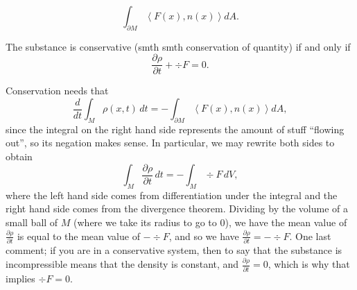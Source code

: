 \[ \int_{\partial M} \left<F(x), n(x)\right> dA. \]
\begin{simpleprop}
    The substance is conservative (smth smth conservation of quantity) if and only if
    \[ \frac{\partial \rho}{\partial t} + \div F = 0. \]
\end{simpleprop}
\noindent Conservation needs that
\[ \frac{d}{dt} \int_M \rho(x, t) \, dt = - \int_{\partial M} \left<F(x), n(x)\right> dA, \]
since the integral on the right hand side represents the amount of stuff ``flowing out'', so its negation makes sense. In particular, we may rewrite both sides to obtain
\[ \int_M \frac{\partial \rho}{\partial t} \, dt = - \int_M \div F \, dV, \]
where the left hand side comes from differentiation under the integral and the right hand side comes from the divergence theorem. Dividing by the volume of a small ball of $M$ (where we take its radius to go to $0$), we have the mean value of $\frac{\partial \rho}{\partial t}$ is equal to the mean value of $-\div F$, and so we have $\frac{\partial \rho}{\partial t} = - \div F$. One last comment; if you are in a conservative system, then to say that the substance is incompressible means that the density is constant, and $\frac{\partial \rho}{\partial t} = 0$, which is why that implies $\div F = 0$.